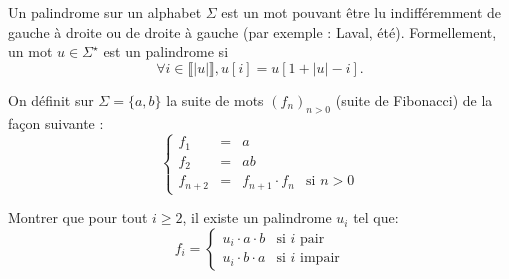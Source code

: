 
\begingroup

\begin{exercice}[Palindrome]\label{exo:introduction/languages/palindrome}
  Un palindrome sur un alphabet $\Sigma$ est un mot pouvant être lu indifféremment de gauche à droite ou de droite à gauche (par exemple : Laval, été).
  Formellement, un mot $u \in \Sigma^\star$ est un palindrome si
  $$\forall i \in \llbracket |u| \rrbracket, u[i] = u[1+|u| - i].$$

  On définit sur $\Sigma =\{a,b\}$ la suite de mots $(f_n)_{n>0}$ (suite de Fibonacci) de la façon suivante :
  $$
  \left\{\begin{array}{rcll}
  f_1 &=& a\\
  f_2 &=& ab \\
  f_{n+2} &=& f_{n+1}\cdot f_n & \text{si $n>0$}
  \end{array}
  \right.
  $$
  
  \begin{questions}
  \item Montrer que pour tout $i \ge 2$, il existe un palindrome $u_i$ tel que:
    $$ f_i = \left \{\begin{array}{ll}
    u_i\cdot a\cdot b & \mbox{si $i$ pair} \\
    u_i\cdot b\cdot a & \mbox{si $i$ impair}
  \end{array}\right.$$
  \end{questions}

\end{exercice}

